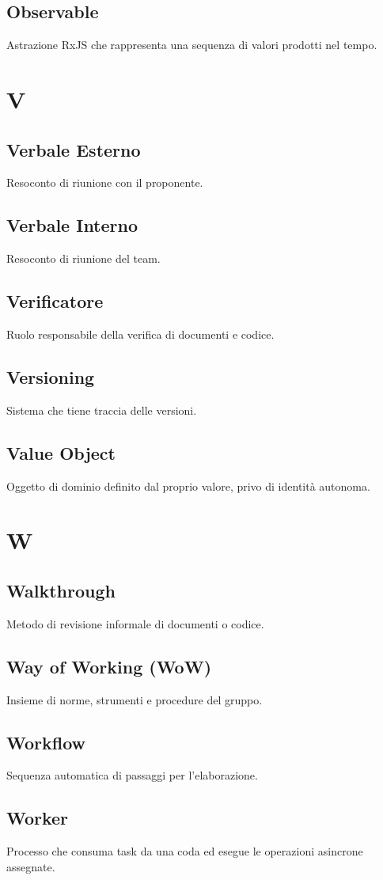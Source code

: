 \documentclass[a4paper,12pt]{article}
\begin{document}
\subsection{Observable}
Astrazione RxJS che rappresenta una sequenza di valori prodotti nel tempo.

\section{V}
\subsection{Verbale Esterno}
Resoconto di riunione con il proponente.

\subsection{Verbale Interno}
Resoconto di riunione del team.

\subsection{Verificatore}
Ruolo responsabile della verifica di documenti e codice.

\subsection{Versioning}
Sistema che tiene traccia delle versioni.

\subsection{Value Object}
Oggetto di dominio definito dal proprio valore, privo di identità autonoma.

\section{W}
\subsection{Walkthrough}
Metodo di revisione informale di documenti o codice.

\subsection{Way of Working (WoW)}
Insieme di norme, strumenti e procedure del gruppo.

\subsection{Workflow}
Sequenza automatica di passaggi per l'elaborazione.

\subsection{Worker}
Processo che consuma task da una coda ed esegue le operazioni asincrone assegnate.
\end{document}
